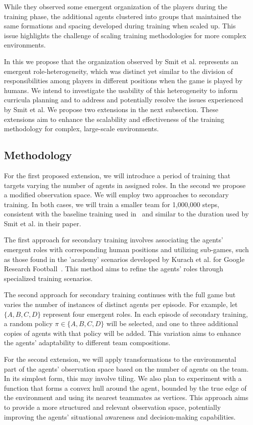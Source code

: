 While they observed some emergent organization of the players during the training phase, 
the additional agents clustered into groups that maintained the same formations and spacing 
developed during training when scaled up. This issue highlights the challenge of scaling 
training methodologies for more complex environments.

In this \printdoctype we propose that the organization observed by Smit et al. represents an 
emergent role-heterogeneity, which was distinct yet similar to the division of responsibilities 
among players in different positions when the game is played by humans. 
We intend to investigate the usability of this heterogeneity to inform curricula planning and
to address and potentially resolve the issues experienced by Smit et al.
We propose two extensions in the next subsection. These extensions aim to enhance the 
scalability and effectiveness of the training methodology for complex, large-scale environments.

\subsection{Methodology}
For the first proposed extension, we will introduce a period of training that targets varying 
the number of agents in assigned roles. In the second we propose a modified observation space.
We will employ two approaches to secondary training. In both cases, 
we will train a smaller team for 1,000,000 steps, consistent with the baseline training used in~
\cite{zhong2024} and similar to the duration used by Smit et al. in their paper.

The first approach for secondary training involves associating the agents' emergent roles with 
corresponding human positions and utilizing sub-games, such as those found in the 'academy' 
scenarios developed by Kurach et al. for Google Research Football~\cite{kurach2020}. 
This method aims to refine the agents' roles through specialized training scenarios.

The second approach for secondary training continues with the full game but varies the number of 
instances of distinct agents per episode. For example, let \(\{A,B,C,D\}\) represent four 
emergent roles. In each episode of secondary training, a random policy \(\pi\in\{A,B,C,D\}\) 
will be selected, and one to three additional copies of agents with that policy will be added. 
This variation aims to enhance the agents' adaptability to different team compositions.

For the second extension, we will apply transformations to the environmental part of the agents' 
observation space based on the number of agents on the team. 
In its simplest form, this may involve tiling. 
We also plan to experiment with a function that forms a convex hull around the agent, 
bounded by the true edge of the environment and using its nearest teammates as vertices. 
This approach aims to provide a more structured and relevant observation space, 
potentially improving the agents' situational awareness and decision-making capabilities.

